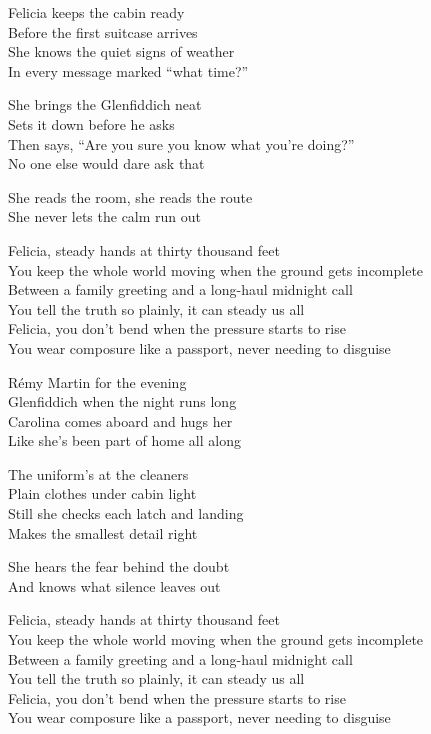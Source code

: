 \begin{lyrics}
Felicia keeps the cabin ready\\
Before the first suitcase arrives\\
She knows the quiet signs of weather\\
In every message marked “what time?”

She brings the Glenfiddich neat\\
Sets it down before he asks\\
Then says, “Are you sure you know what you’re doing?”\\
No one else would dare ask that

She reads the room, she reads the route\\
She never lets the calm run out

Felicia, steady hands at thirty thousand feet\\
You keep the whole world moving when the ground gets incomplete\\
Between a family greeting and a long-haul midnight call\\
You tell the truth so plainly, it can steady us all\\
Felicia, you don’t bend when the pressure starts to rise\\
You wear composure like a passport, never needing to disguise

Rémy Martin for the evening\\
Glenfiddich when the night runs long\\
Carolina comes aboard and hugs her\\
Like she’s been part of home all along

The uniform’s at the cleaners\\
Plain clothes under cabin light\\
Still she checks each latch and landing\\
Makes the smallest detail right

She hears the fear behind the doubt\\
And knows what silence leaves out

Felicia, steady hands at thirty thousand feet\\
You keep the whole world moving when the ground gets incomplete\\
Between a family greeting and a long-haul midnight call\\
You tell the truth so plainly, it can steady us all\\
Felicia, you don’t bend when the pressure starts to rise\\
You wear composure like a passport, never needing to disguise


\end{lyrics}
